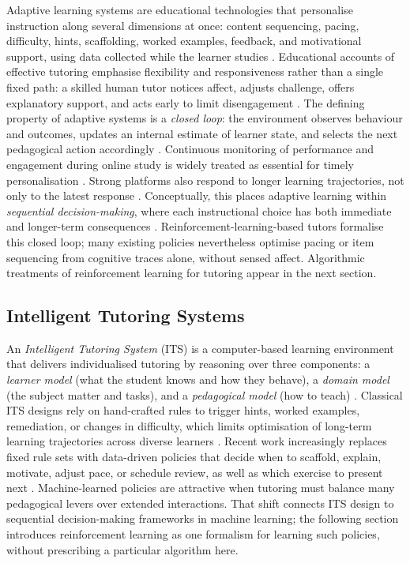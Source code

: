 Adaptive learning systems are educational technologies that personalise instruction along several dimensions at once: content sequencing, pacing, difficulty, hints, scaffolding, worked examples, feedback, and motivational support, using data collected while the learner studies \cite{gligorea_adaptive_2023,strielkowski_span_2025,zerkouk_comprehensive_2025}. Educational accounts of effective tutoring emphasise flexibility and responsiveness rather than a single fixed path: a skilled human tutor notices affect, adjusts challenge, offers explanatory support, and acts early to limit disengagement \cite{pekrun_control-value_2006,yuvaraj_affective_2025}. The defining property of adaptive systems is a \emph{closed loop}: the environment observes behaviour and outcomes, updates an internal estimate of learner state, and selects the next pedagogical action accordingly \cite{gligorea_adaptive_2023,zerkouk_comprehensive_2025}. Continuous monitoring of performance and engagement during online study is widely treated as essential for timely personalisation \cite{strielkowski_span_2025,florestiyanto_emotion_2024}. Strong platforms also respond to longer learning trajectories, not only to the latest response \cite{fu_integrating_2025,guzman_developing_2025}. Conceptually, this places adaptive learning within \emph{sequential decision-making}, where each instructional choice has both immediate and longer-term consequences \cite{kabudi_ai-enabled_2021}. Reinforcement-learning-based tutors formalise this closed loop; many existing policies nevertheless optimise pacing or item sequencing from cognitive traces alone, without sensed affect. Algorithmic treatments of reinforcement learning for tutoring appear in the next section.

\subsection{Intelligent Tutoring Systems}\label{sec:bg:its}

An \emph{Intelligent Tutoring System} (ITS) is a computer-based learning environment that delivers individualised tutoring by reasoning over three components: a \emph{learner model} (what the student knows and how they behave), a \emph{domain model} (the subject matter and tasks), and a \emph{pedagogical model} (how to teach) \cite{zerkouk_comprehensive_2025,kabudi_ai-enabled_2021}. Classical ITS designs rely on hand-crafted rules to trigger hints, worked examples, remediation, or changes in difficulty, which limits optimisation of long-term learning trajectories across diverse learners \cite{guzman_developing_2025}. Recent work increasingly replaces fixed rule sets with data-driven policies that decide when to scaffold, explain, motivate, adjust pace, or schedule review, as well as which exercise to present next \cite{axak_adaptive_nodate,deshmukh_developing_2025,guzman_developing_2025,meng_self-evolving_2025}. Machine-learned policies are attractive when tutoring must balance many pedagogical levers over extended interactions. That shift connects ITS design to sequential decision-making frameworks in machine learning; the following section introduces reinforcement learning as one formalism for learning such policies, without prescribing a particular algorithm here.

